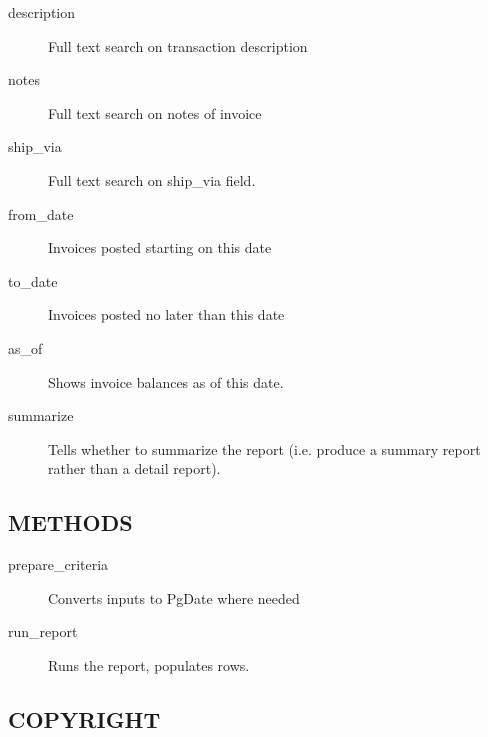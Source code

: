 \begin{description}
\begin{description}
\begin{description}
\begin{description}
\begin{description}
\begin{description}
\begin{description}
\begin{description}
\begin{description}
\begin{description}
\begin{description}
\item[{description}] \mbox{}

Full text search on transaction description


\item[{notes}] \mbox{}

Full text search on notes of invoice


\item[{ship\_via}] \mbox{}

Full text search on ship\_via field.


\item[{from\_date}] \mbox{}

Invoices posted starting on this date


\item[{to\_date}] \mbox{}

Invoices posted no later than this date


\item[{as\_of}] \mbox{}

Shows invoice balances as of this date.


\item[{summarize}] \mbox{}

Tells whether to summarize the report (i.e. produce a summary report rather than
a detail report).

\end{description}
\subsection*{METHODS\label{LedgerSMB::DBObject::Report::Contact::Purchase_METHODS}}
\begin{description}

\item[{prepare\_criteria}] \mbox{}

Converts inputs to PgDate where needed


\item[{run\_report}] \mbox{}

Runs the report, populates rows.

\end{description}
\subsection*{COPYRIGHT\label{LedgerSMB::DBObject::Report::Contact::Purchase_COPYRIGHT}}



\end{description}
\end{description}
\end{description}
\end{description}
\end{description}
\end{description}
\end{description}
\end{description}
\end{description}
\end{description}
